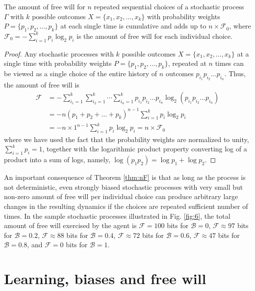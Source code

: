 \documentclass{ws-ijmpb}
\begin{document}
\begin{theorem}
\label{thm:nF}The amount of free will for $n$ repeated sequential choices of
a stochastic process~$\Gamma$ with $k$ possible outcomes $X=\{x_{1},x_{2},\ldots,x_{k}\}$
with probability weights $P=\{p_{1},p_{2},\ldots,p_{k}\}$ at each
single time is cumulative and adds up to $n\times\mathscr{F}_{0}$,
where $\mathscr{F}_{0}=-\sum_{i=1}^{k}p_{i}\log_{2}p_{i}$ is the
amount of free will for each individual choice.
\end{theorem}
\begin{proof}
Any stochastic processes with $k$ possible outcomes $X=\{x_{1},x_{2},\ldots,x_{k}\}$
at a single time with probability weights $P=\{p_{1},p_{2},\ldots,p_{k}\}$,
repeated at $n$ times can be viewed as a single choice of the entire
history of $n$ outcomes $p_{i_{1}}p_{i_{2}}\ldots p_{i_{n}}$. Thus,
the amount of free will is
\begin{align}
\mathscr{F} & =-\sum_{i_{1}=1}^{k}\sum_{i_{2}=1}^{k}\cdots\sum_{i_{n}=1}^{k}p_{i_{1}}p_{i_{2}}\ldots p_{i_{n}}\log_{2}\left(p_{i_{1}}p_{i_{2}}\ldots p_{i_{n}}\right)\nonumber \\
 & =-n\left(p_{1}+p_{2}+\ldots+p_{k}\right)^{n-1}\sum_{i=1}^{k}p_{i}\log_{2}p_{i}\nonumber \\
 & =-n\times1^{n-1}\sum_{i=1}^{k}p_{i}\log_{2}p_{i}=n\times\mathscr{F}_{0}
\end{align}
where we have used the fact that the probability weights are normalized
to unity, $\sum_{i=1}^{k}p_{i}=1$, together with the logarithmic
product property converting log of a product into a sum of logs, namely,
$\log(p_{1}p_{2})=\log p_{1}+\log p_{2}$.
\end{proof}
An important consequence of Theorem \ref{thm:nF} is that as long
as the process is not deterministic, even strongly biased stochastic
processes with very small but non-zero amount of free will per individual
choice can produce arbitrary large changes in the resulting dynamics
if the choices are repeated sufficient number of times. In the sample
stochastic processes illustrated in Fig. \ref{fig:6}, the total amount
of free will exercised by the agent is $\mathscr{F}=100$ bits for
$\mathscr{B}=0$, $\mathscr{F}\approx97$ bits for $\mathscr{B}=0.2$,
$\mathscr{F}\approx88$ bits for $\mathscr{B}=0.4$, $\mathscr{F}\approx72$
bits for $\mathscr{B}=0.6$, $\mathscr{F}\approx47$ bits for $\mathscr{B}=0.8$,
and $\mathscr{F}=0$ bits for $\mathscr{B}=1$.

\section{Learning, biases and free will}
\label{S6}
\end{document}
